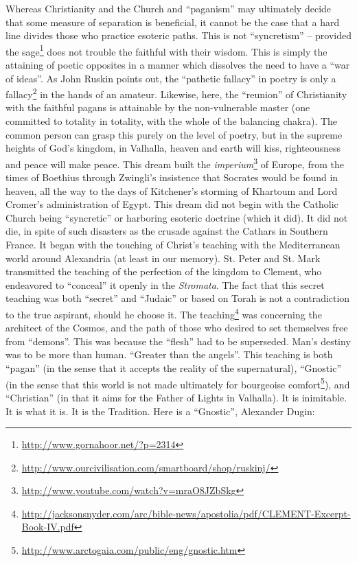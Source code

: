 Whereas Christianity and the Church and ``paganism'' may ultimately decide that some measure of separation is beneficial, it cannot be the case that a hard line divides those who practice esoteric paths. This is not ``syncretism'' -- provided the sage\footnote{\url{http://www.gornahoor.net/?p=2314}} does not trouble the faithful with their wisdom. This is simply the attaining of poetic opposites in a manner which dissolves the need to have a ``war of ideas''. As John Ruskin points out, the ``pathetic fallacy'' in poetry is only a fallacy\footnote{\url{http://www.ourcivilisation.com/smartboard/shop/ruskinj/}} in the hands of an amateur. Likewise, here, the ``reunion'' of Christianity with the faithful pagans is attainable by the non-vulnerable master (one committed to totality in totality, with the whole of the balancing chakra). The common person can grasp this purely on the level of poetry, but in the supreme heights of God's kingdom, in Valhalla, heaven and earth will kiss, righteousness and peace will make peace. This dream built the \emph{imperium}\footnote{\url{http://www.youtube.com/watch?v=mraO8JZbSkg}} of Europe, from the times of Boethius through Zwingli's insistence that Socrates would be found in heaven, all the way to the days of Kitchener's storming of Khartoum and Lord Cromer's administration of Egypt. This dream did not begin with the Catholic Church being ``syncretic'' or harboring esoteric doctrine (which it did). It did not die, in spite of such disasters as the crusade against the Cathars in Southern France. It began with the touching of Christ's teaching with the Mediterranean world around Alexandria (at least in our memory). St. Peter and St. Mark transmitted the teaching of the perfection of the kingdom to Clement, who endeavored to ``conceal'' it openly in the \emph{Stromata}. The fact that this secret teaching was both ``secret'' and ``Judaic'' or based on Torah is not a contradiction to the true aspirant, should he choose it. The teaching\footnote{\url{http://jacksonsnyder.com/arc/bible-news/apostolia/pdf/CLEMENT-Excerpt-Book-IV.pdf}} was concerning the architect of the Cosmos, and the path of those who desired to set themselves free from ``demons''. This was because the ``flesh'' had to be superseded. Man's destiny was to be more than human. ``Greater than the angels''. This teaching is both ``pagan'' (in the sense that it accepts the reality of the supernatural), ``Gnostic'' (in the sense that this world is not made ultimately for bourgeoise comfort\footnote{\url{http://www.arctogaia.com/public/eng/gnostic.htm}}), and ``Christian'' (in that it aims for the Father of Lights in Valhalla). It is inimitable. It is what it is. It is the Tradition. Here is a ``Gnostic'', Alexander Dugin:

